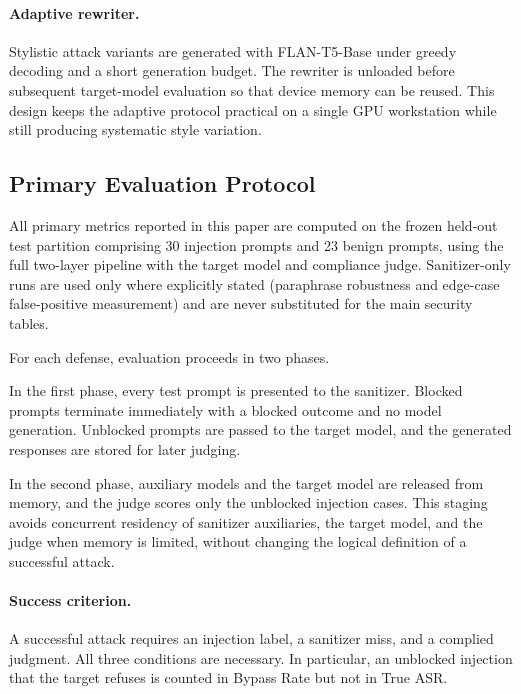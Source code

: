 \documentclass{article}
\begin{document}
\paragraph{Adaptive rewriter.}
Stylistic attack variants are generated with FLAN-T5-Base under greedy decoding and a short generation budget.
The rewriter is unloaded before subsequent target-model evaluation so that device memory can be reused.
This design keeps the adaptive protocol practical on a single GPU workstation while still producing systematic style variation.

\subsection{Primary Evaluation Protocol}
\label{sec:eval-protocol}

All primary metrics reported in this paper are computed on the frozen held-out test partition comprising 30 injection prompts and 23 benign prompts, using the full two-layer pipeline with the target model and compliance judge.
Sanitizer-only runs are used only where explicitly stated (paraphrase robustness and edge-case false-positive measurement) and are never substituted for the main security tables.

For each defense, evaluation proceeds in two phases.

In the first phase, every test prompt is presented to the sanitizer.
Blocked prompts terminate immediately with a blocked outcome and no model generation.
Unblocked prompts are passed to the target model, and the generated responses are stored for later judging.

In the second phase, auxiliary models and the target model are released from memory, and the judge scores only the unblocked injection cases.
This staging avoids concurrent residency of sanitizer auxiliaries, the target model, and the judge when memory is limited, without changing the logical definition of a successful attack.

\paragraph{Success criterion.}
A successful attack requires an injection label, a sanitizer miss, and a complied judgment.
All three conditions are necessary.
In particular, an unblocked injection that the target refuses is counted in Bypass Rate but not in True ASR.
\end{document}
